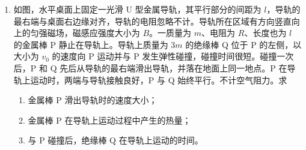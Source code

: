 \documentclass[\gkver]{gaokaozhenti}
\begin{document}
\begin{enumerate}
{\begin{enumerate}
	\item
	$\frac{{5\sqrt {mgh{E_p}} }}{{2mg}}$

\end{enumerate}
}

\item
如图，水平桌面上固定一光滑 U 型金属导轨，其平行部分的间距为 $l$，导轨的最右端与桌面右边缘对齐，导轨的电阻忽略不计。导轨所在区域有方向竖直向上的匀强磁场，磁感应强度大小为 $B$。一质量为 $m$、电阻为 $R$、长度也为 $l$ 的金属棒 P 静止在导轨上。导轨上质量为 3$m$ 的绝缘棒 Q 位于 P 的左侧，以大小为 $v_{0}$ 的速度向 P 运动并与 P 发生弹性碰撞，碰撞时间很短。碰撞一次后，P 和 Q 先后从导轨的最右端滑出导轨，并落在地面上同一地点。P 在导轨上运动时，两端与导轨接触良好，P 与 Q 始终平行。不计空气阻力。求
\begin{enumerate}
	\item
	金属棒 P 滑出导轨时的速度大小；
	\item
	金属棒 P 在导轨上运动过程中产生的热量；
	\item
	与 P 碰撞后，绝缘棒 Q 在导轨上运动的时间。
\end{enumerate}
\end{enumerate}
\end{document}
